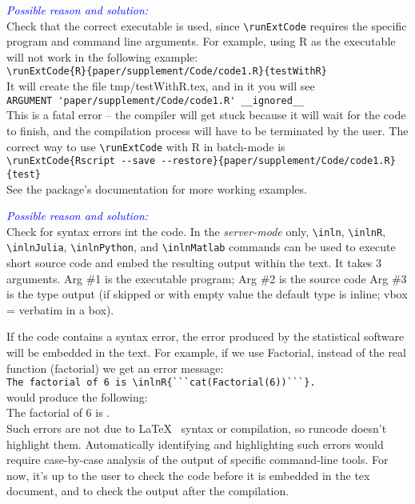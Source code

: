\documentclass[a4paper,10pt]{article}
\newcommand{\cause}[1] {\noindent\textit{\textcolor{blue}{Possible reason and solution:}}\\#1}
\begin{document}
\cause\bgroup
Check that the correct executable is used, since \verb|\runExtCode| requires the specific program and command line arguments. For example, using R as the executable will not work in the following example:\\
\verb|\runExtCode{R}{paper/supplement/Code/code1.R}{testWithR}|\\
It will create the file tmp/testWithR.tex, and in it you will see\\
\verb|ARGUMENT 'paper/supplement/Code/code1.R' __ignored__|\\
This is a fatal error -- the compiler will get stuck because it will wait for the code to finish, and the compilation process will have to be terminated by the user.
\noindent
The correct way to use \verb|\runExtCode| with R in batch-mode is\\
\verb|\runExtCode{Rscript --save --restore}{paper/supplement/Code/code1.R}{test}|\\
See the package's documentation for more working examples.\\
\egroup


\cause\bgroup
Check for syntax errors int the code.
In the \textit{server-mode} only, \verb|\inln|, \verb|\inlnR|, \verb|\inlnJulia|, \verb|\inlnPython|, and \verb|\inlnMatlab| commands can be used to execute short source code and embed the resulting output within the text. It takes 3 arguments.
Arg \#1 is the executable program;
Arg \#2 is the source code
Arg \#3 is the type output (if skipped or with empty value the default type is inline; vbox = verbatim in a box).

\noindent If the code contains a syntax error, the error produced by the statistical software will be embedded in the text. For example, if we use Factorial, instead of the real function (factorial) we get an error message:\\
\verb|The factorial of 6 is \inlnR{```cat(Factorial(6))```}.|\\
would produce the following:\\
The factorial of 6 is .\\

\noindent Such errors are not due to \LaTeX~ syntax or compilation, so runcode doesn't highlight them. Automatically identifying and highlighting such errors would require case-by-case analysis of the output of specific command-line tools. For now, it's up to the user to check the code before it is embedded in the tex document, and to check the output after the compilation.
\egroup
\end{document}
